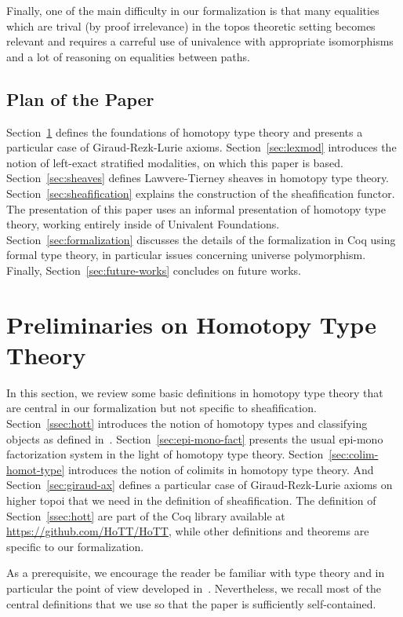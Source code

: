 \documentclass[conference]{IEEEtran}
\begin{document}
Finally, one of the main difficulty in our formalization is that many
equalities which are trival (by proof irrelevance) in the topos theoretic
setting becomes relevant and requires a carreful use of univalence
with appropriate isomorphisms and a lot of reasoning on equalities
between paths.

\subsection{Plan of the Paper}

Section~\ref{sec:hott} defines the foundations of homotopy type theory
and presents a particular case of Giraud-Rezk-Lurie axioms. 
%
Section~\ref{sec:lexmod} introduces the notion of left-exact stratified
modalities, on which this paper is based.
%
Section~\ref{sec:sheaves} defines Lawvere-Tierney sheaves in homotopy
type theory.
%
Section~\ref{sec:sheafification} explains the construction of the
sheafification functor.
%
The presentation of this paper uses an informal presentation of
homotopy type theory, working entirely inside of Univalent
Foundations. 
Section~\ref{sec:formalization} discusses the details of the
formalization in Coq using formal type theory, in particular issues
concerning universe polymorphism.
%
Finally, Section~\ref{sec:future-works} concludes on future works.


\section{Preliminaries on Homotopy Type Theory}
\label{sec:hott}

In this section, we review some basic definitions in homotopy type
theory that are central in our formalization but not specific to
sheafification. 
%
Section~\ref{ssec:hott} introduces the notion of homotopy types and
classifying objects as defined in~\cite{sets_in_hott}.
%
Section~\ref{sec:epi-mono-fact} presents the usual epi-mono
factorization system in the light of homotopy type theory.
%
Section~\ref{sec:colim-homot-type} introduces the notion of colimits
in homotopy type theory. 
%
And Section~\ref{sec:giraud-ax} defines a particular case of
Giraud-Rezk-Lurie axioms on higher topoi that we need in the
definition of sheafification.
%
The definition of Section~\ref{ssec:hott} are part of the Coq library
available at \url{https://github.com/HoTT/HoTT}, while other definitions
and theorems are specific to our formalization. 

As a prerequisite, we encourage the reader be familiar with type theory and
in particular the point of view developed
in~\cite{hottbook}. Nevertheless, we recall most of the central definitions 
that we use so that the paper is sufficiently self-contained.
%
\end{document}
